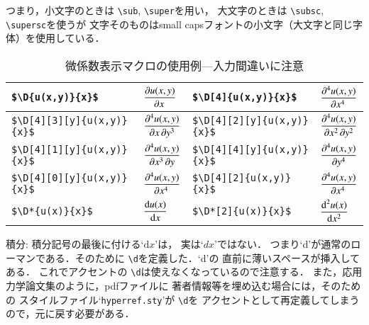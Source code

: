 \documentclass[onecolumn]{jsce}  %
\begin{document}
\begin{Description}
\noindent
つまり，小文字のときは \verb+\sub+, \verb+\super+を用い，
大文字のときは \verb+\subsc+, \verb+\supersc+を使うが
文字そのものはsmall capsフォントの小文字（大文字と同じ字体）を使用している．
%
\begin{table}
\caption{微係数表示マクロの使用例---入力間違いに注意}
\label{tab:derivative}
\renewcommand{\arraystretch}{1.7}
\begin{center}
\begin{tabular}{|l|l||l|l|}\hline
\verb+$\D{u(x,y)}{x}$+ &
$\displaystyle\D{u(x,y)}{x}$ &
\verb+$\D[4]{u(x,y)}{x}$+ &
$\displaystyle\D[4]{u(x,y)}{x}$ \\ \hline
%
\verb+$\D[4][3][y]{u(x,y)}{x}$+ &
$\displaystyle\D[4][3][y]{u(x,y)}{x}$ &
\verb+$\D[4][2][y]{u(x,y)}{x}$+ &
$\displaystyle\D[4][2][y]{u(x,y)}{x}$ \\ \hline
%
\verb+$\D[4][1][y]{u(x,y)}{x}$+ &
$\displaystyle\D[4][1][y]{u(x,y)}{x}$ &
\verb+$\D[4][4][y]{u(x,y)}{x}$+ &
$\displaystyle\D[4][4][y]{u(x,y)}{x}$ \\ \hline
%
\verb+$\D[4][0][y]{u(x,y)}{x}$+ &
$\displaystyle\D[4][0][y]{u(x,y)}{x}$ &
\verb+$\D[4][2]{u(x,y)}{x}$+ &
$\displaystyle\D[4][2]{u(x,y)}{x}$ \\ \hline
%
\verb+$\D*{u(x)}{x}$+ &
$\displaystyle\D*{u(x)}{x}$ &
\verb+$\D*[2]{u(x)}{x}$+ &
$\displaystyle\D*[2]{u(x)}{x}$ \\ \hline
\end{tabular}
\end{center}
\end{table}
%
\item[積分:] 積分記号の最後に付ける`$\mbox{d} x$'は，
実は`$d x$'ではない．
つまり`d'が通常のローマンである．そのために \verb+\d+を定義した．`d'の
直前に薄いスペースが挿入してある．
これでアクセントの \verb+\d+は使えなくなっているので注意する．
また，応用力学論文集のように，pdfファイルに
著者情報等を埋め込む場合には，そのための
スタイルファイル`{\tt hyperref.sty}'が \verb+\d+を
アクセントとして再定義してしまうので，元に戻す必要がある．


\end{Description}
\end{document}
